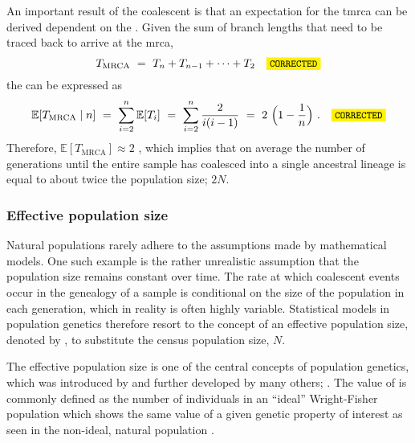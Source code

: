 An important result of the coalescent is that an expectation for the \gls{tmrca} can be derived dependent on the .
Given the sum of branch lengths that need to be traced back to arrive at the \gls{mrca},
\begin{equation*}
	T_\text{MRCA} ~=~ T_n + T_{n-1} + \dots + T_2 \CorrectLabel
\end{equation*}
the  can be expressed as
\begin{equation}\label{eq:coal_tmrca}
	\mathbb{E}[T_\text{MRCA} \mid n]
	~=~ \sum_{i = 2}^{n} \mathbb{E}[T_i]
	~=~ \sum_{i = 2}^{n} \frac{2}{i(i-1)}
	~=~ 2~\Big( 1 - \frac{1}{n} \Big)
	\ \text{.} \CorrectLabel
\end{equation}
Therefore,  ${\mathbb{E}[T_\text{MRCA}] \approx 2}$ , which implies that on average the number of generations until the entire sample has coalesced into a single ancestral lineage is equal to about twice the population size; \ie $2N$.


%
\subsubsection{Effective population size}
%


Natural populations rarely adhere to the assumptions made by mathematical models.
One such example is the rather unrealistic assumption that the population size remains constant over time.
The rate at which coalescent events occur in the genealogy of a sample is conditional on the size of the population in each generation, which in reality is often highly variable.
Statistical models in population genetics therefore resort to the concept of an effective population size, denoted by \Ne, to substitute the census population size, $N$.

The effective population size is one of the central concepts of population genetics, which was introduced by \citet{Wright1931} and further developed by many others; \eg \citet{crow1970introduction}.
The value of \Ne is commonly defined as the number of individuals in an ``ideal'' Wright-Fisher population \citep{Fisher1930,Wright1931} which shows the same value of a given genetic property of interest as seen in the non-ideal, natural population \citep{ewens2012}.

